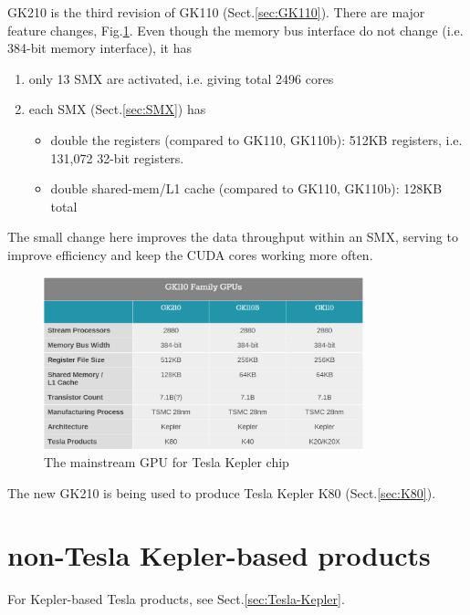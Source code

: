 GK210 is the third revision of GK110 (Sect.\ref{sec:GK110}). There are major
feature changes, Fig.\ref{fig:GK110_mainstreams}. Even though the memory bus
interface do not change (i.e. 384-bit memory interface), it has
\begin{enumerate}
  \item only 13 SMX are activated, i.e. giving total 2496 cores
  
  \item each SMX (Sect.\ref{sec:SMX}) has
  \begin{itemize}
 
    \item double the registers (compared to GK110, GK110b): 512KB registers,
   i.e.   131,072 32-bit registers.
  
    \item double shared-mem/L1 cache (compared to GK110, GK110b): 128KB total 
  
  \end{itemize}
\end{enumerate} 
The small change here improves the data throughput within an SMX,
serving to improve efficiency and keep the CUDA cores working more often. 

\begin{figure}[hbt]
  \centerline{\includegraphics[height=5cm,
    angle=0]{./images/GK110_mainstreams.eps}}
  \caption{The mainstream GPU for Tesla Kepler chip}
  \label{fig:GK110_mainstreams}
\end{figure}

The new GK210 is being used to produce Tesla Kepler K80 (Sect.\ref{sec:K80}).



\section{non-Tesla Kepler-based products}
\label{sec:Kepler-non-Tesla}

For Kepler-based Tesla products, see Sect.\ref{sec:Tesla-Kepler}.


